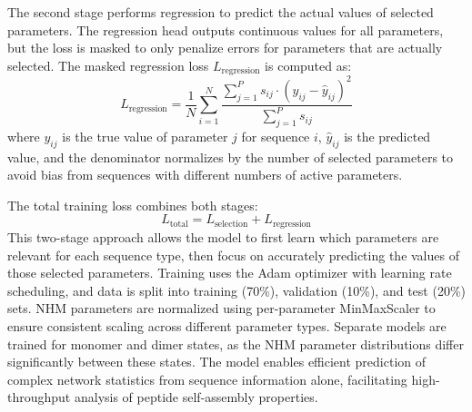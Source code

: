 The second stage performs regression to predict the actual values of selected parameters.
The regression head outputs continuous values for all parameters, but the loss is masked to only penalize errors for parameters that are actually selected.
The masked regression loss $L_{\text{regression}}$ is computed as:
\begin{equation}
L_{\text{regression}} = \frac{1}{N} \sum_{i=1}^{N} \frac{\sum_{j=1}^{P} s_{ij} \cdot (y_{ij} - \hat{y}_{ij})^2}{\sum_{j=1}^{P} s_{ij}}
\end{equation}
where $y_{ij}$ is the true value of parameter $j$ for sequence $i$, $\hat{y}_{ij}$ is the predicted value, and the denominator normalizes by the number of selected parameters to avoid bias from sequences with different numbers of active parameters.

The total training loss combines both stages:
\begin{equation}
L_{\text{total}} = L_{\text{selection}} + L_{\text{regression}}
\end{equation}
This two-stage approach allows the model to first learn which parameters are relevant for each sequence type, then focus on accurately predicting the values of those selected parameters.
Training uses the Adam optimizer with learning rate scheduling, and data is split into training (70\%), validation (10\%), and test (20\%) sets.
NHM parameters are normalized using per-parameter MinMaxScaler to ensure consistent scaling across different parameter types.
Separate models are trained for monomer and dimer states, as the NHM parameter distributions differ significantly between these states.
The model enables efficient prediction of complex network statistics from sequence information alone, facilitating high-throughput analysis of peptide self-assembly properties.

